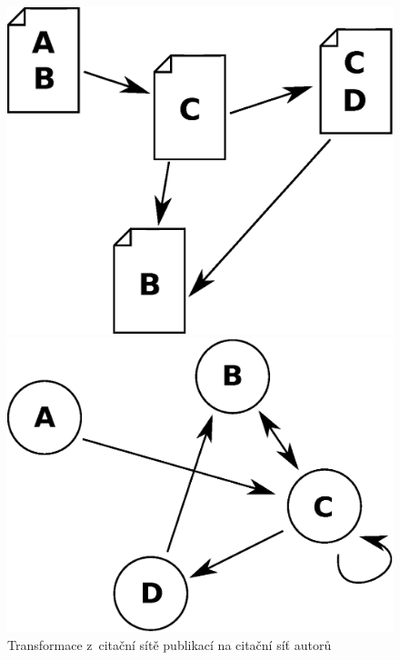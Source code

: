 \documentclass{bakalarka}
\begin{document}
\begin{figure}[!ht]
\begin{minipage}[b]{0.45\textwidth}
\centering
	\includegraphics[width=\textwidth]{pubs.eps}
\end{minipage}
\hspace{0.5cm}
\begin{minipage}[b]{0.45\textwidth}
\centering
	\includegraphics[width=\textwidth]{auths.eps}
\end{minipage}
\caption{Transformace z~citační sítě publikací na citační síť autorů}
\label{fig:transform}
\end{figure}
\end{document}
